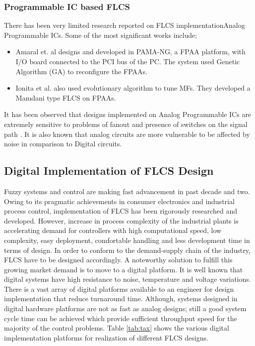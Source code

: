 \subsubsection{Programmable IC based FLCS}
There has been very limited research reported on FLCS implementationAnalog Programmable ICs. Some of the most significant works include;
\begin{itemize}
	\item Amaral et. al\cite{Amaral2004} designs and developed in PAMA\hyp{}NG, a FPAA platform, with I/O board connected to the PCI bus of the PC. The system used Genetic Algorithm (GA) to reconfigure the FPAAs. 
	\item Ionita et al.\cite{Ionita2005} also used evolutionary algorithm to tune MFs. They developed a Mamdani type FLCS on FPAAs.
\end{itemize}
{It has been observed that designs implemented on Analog Programmable ICs are extremely sensitive to problems of fanout and presence of switches on the signal path \cite{pierzchala2013field}. It is also known that analog circuits are more vulnerable to be affected by noise in comparison to Digital circuits.}

\subsection{Digital Implementation of FLCS Design} 
Fuzzy systems and control are making fast advancement in past decade and two. Owing to its pragmatic achievements in consumer electronics and industrial process control, implementation of FLCS has been rigorously researched and developed. However, increase in process complexity of the industrial plants is accelerating demand for controllers with high computational speed, low complexity, easy deployment, comfortable handling and less development time in terms of design. {In order to conform to the demand\hyp{}supply chain of the industry, FLCS have to be designed accordingly.} A noteworthy solution to fulfill this growing market demand is to move to a digital platform. It is well known that digital systems have high resistance to noise, temperature and voltage variations. There is a vast array of digital platforms available to an engineer for design implementation that reduce turnaround time. Although, systems designed in digital hardware platforms are not as fast as analog designs; still a good system cycle time can be achieved which provide sufficient throughput speed for the majority of the control problems. Table \ref{tab:tax} shows the various digital implementation platforms for realization of different FLCS designs.

